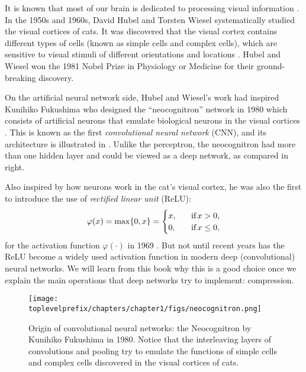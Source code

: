 \documentclass[../../book-main.tex]{subfiles}
\begin{document}
It is known that most of our brain is dedicated to processing visual information \cite{PalmerS1999}. In the 1950s and 1960s, David Hubel and Torsten Wiesel systematically studied the visual cortices of cats. It was discovered that the visual cortex contains different types of cells (known as simple cells and complex cells), which are sensitive to visual stimuli of different orientations and locations \cite{Hubel-Wiesel-1959}. Hubel and Wiesel won the 1981 Nobel Prize in Physiology or Medicine for their ground-breaking discovery. 


On the artificial neural network side, Hubel and Wiesel's work had inspired Kunihiko Fukushima who designed the ``neocognitron'' network in 1980 which consists of artificial neurons that emulate biological neurons in the visual cortices \cite{Fukushima1980NeocognitronAS}. This is known as the first {\em convolutional neural network} (CNN), and its architecture is illustrated in . Unlike the perceptron, the neocognitron had more than one hidden layer and could be viewed as a deep network, as compared in  right.

Also inspired by how neurons work in the cat's visual cortex, he was also the first to introduce the use of {\em rectified linear unit} (ReLU):
\begin{equation}
    \varphi(x) = \max\{0, x\} = \begin{cases}x, & \text{if} \, x > 0, \\ 0, \quad & \text{if} \, x \leq 0,\end{cases}
\end{equation}
for the activation function $\varphi(\cdot)$ in 1969 \cite{Fukushima-1969}. But not until recent years has the ReLU become a widely used activation function in modern deep (convolutional) neural networks. We will learn from this book why this is a good choice once we explain the main operations that deep networks try to implement: compression. 

\begin{figure}
    \centering
    \texttt{[image: \\toplevelprefix/chapters/chapter1/figs/neocognitron.png]}
    \caption{Origin of convolutional neural networks: the Neocognitron by Kunihiko Fukushima in 1980. Notice that the interleaving layers of convolutions and pooling try to emulate the functions of simple cells and complex cells discovered in the visual cortices of cats.}
    \label{fig:neocognitron}
\end{figure}
\end{document}
